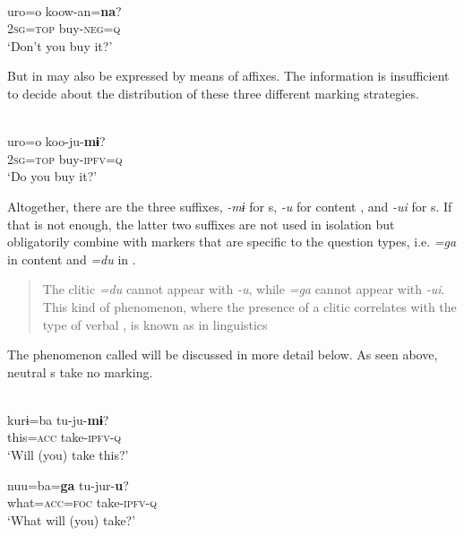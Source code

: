 \ea%
    \label{ex:japa:18}
    \\
    \gll uro=o    koow-an=\textbf{{na}}?\\
    2\textsc{sg}=\textsc{top}  buy-\textsc{neg}=\textsc{q}\\
    \glt ‘Don’t you buy it?’ \citep[337]{Niinaga2015}
    \z

But  in  may also be expressed by means of affixes. The information is insufficient to decide about the distribution of these three different marking strategies.

\ea%
    \label{ex:japa:19}
    \\
    \gll uro=o    koo-ju-\textbf{{mɨ}}?\\
    2\textsc{sg}=\textsc{top}  buy-\textsc{ipfv}=\textsc{q}\\
    \glt ‘Do you buy it?’ \citep[337]{Niinaga2015}
    \z

Altogether, there are the three suffixes, \textit{-mɨ} for s, \textit{-u} for content , and \textit{-ui} for s. If that is not enough, the latter two suffixes are not used in isolation but obligatorily combine with  markers that are specific to the question types, i.e. \textit{=ga} in content and \textit{=du} in  .

\begin{quote}
The clitic \textit{=du} cannot appear with \textit{-u}, while \textit{=ga} cannot appear with \textit{-ui}. This kind of phenomenon, where the presence of a  clitic correlates with the type of verbal , is known as \textit{} in  linguistics \citep[75]{Niinaga2010}
\end{quote}

\noindent The phenomenon called \textit{} will be discussed in more detail below. As seen above, neutral s take no  marking.

\ea%
    \label{ex:japa:20}
    \\
    \ea
    \gll kurɨ=ba tu-ju-\textbf{{mɨ}}?\\
    this=\textsc{acc} take-\textsc{ipfv}-\textsc{q}\\
    \glt ‘Will (you) take this?’
    
    \ex
    \gll nuu=ba=\textbf{{ga}} tu-jur-\textbf{{u}}?\\
    what=\textsc{acc}=\textsc{foc}   take-\textsc{ipfv}-\textsc{q}\\
    \glt ‘What will (you) take?’
    
